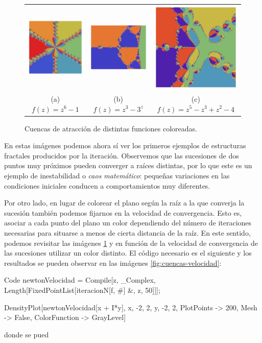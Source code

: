 \begin{figure}[ht]
    \centering
    \begin{tabular}{ccc}
      \includegraphics[scale=0.33]{img/C2/cuencas-color-1.png} &   \includegraphics[scale=0.31]{img/C2/cuencas-color-2.png} &   \includegraphics[scale=0.33]{img/C2/cuencas-color-3.png} \\
    (a) $f(z)=z^6-1$ & (b) $f(z)=z^3-3^z$ & (c) $f(z)=z^5-z^3+z^2-4$ \\[6pt]
    \end{tabular}
    \caption{Cuencas de atracción de distintas funciones coloreadas.}
    \label{fig:cuencas-raiz}
\end{figure}

En estas imágenes podemos ahora sí ver los primeros ejemplos de estructuras fractales producidos por la iteración. Observemos que las sucesiones de dos puntos muy próximos pueden converger a raíces distintas, por lo que este es un ejemplo de inestabilidad o \textit{caos matemático}: pequeñas variaciones en las condiciones iniciales conducen a comportamientos muy diferentes. 

Por otro lado, en lugar de colorear el plano según la raíz a la que converja la sucesión también podemos fijarnos en la velocidad de convergencia. Esto es, asociar a cada punto del plano un color dependiendo del número de iteraciones necesarias para situarse a menos de cierta distancia de la raíz. En este sentido, podemos revisitar las imágenes \ref{fig:cuencas-raiz} y en función de la velocidad de convergencia de las sucesiones utilizar un color distinto. El código necesario es el siguiente y los resultados se pueden observar en las imágenes \ref{fig:cuencas-velocidad}:

\begin{mmaCell}{Code}
  newtonVelocidad = Compile[{{z, _Complex}}, 
    Length[FixedPointList[iteracionN[f, #] &, z, 50]]];
    
  DensityPlot[newtonVelocidad[x + I*y], {x, -2, 2}, {y, -2, 2}, 
    PlotPoints -> 200, Mesh -> False, ColorFunction -> GrayLevel]
\end{mmaCell}
donde se pued